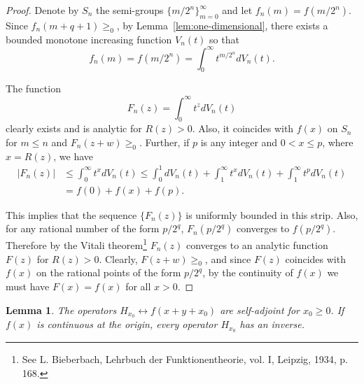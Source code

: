 \documentclass{article}
\newtheorem{lemma}{Lemma}
\begin{document}
\begin{proof}
Denote by $S_n$ the semi-groups $\{m/2^n\}_{m=0}^{\infty}$ and let $f_n(m) = f(m/2^n)$. Since $f_n(m+q+1) \geq_0$, by Lemma~\ref{lem:one-dimensional}, there exists a bounded monotone increasing function $V_n(t)$ so that
\begin{equation}
f_n(m) = f(m/2^n) = \int_0^{\infty} t^{m/2^n} dV_n(t).
\label{eq:discrete-representation}
\end{equation}

The function
\begin{equation}
F_n(z) = \int_0^{\infty} t^z dV_n(t)
\label{eq:analytic-function}
\end{equation}
clearly exists and is analytic for $R(z) > 0$. Also, it coincides with $f(x)$ on $S_n$ for $m \leq n$ and $F_n(z+w) \geq_0$. Further, if $p$ is any integer and $0 < x \leq p$, where $x = R(z)$, we have
\begin{align}
|F_n(z)| &\leq \int_0^{\infty} t^x dV_n(t) \leq \int_0^1 dV_n(t) + \int_1^{\infty} t^x dV_n(t) + \int_1^{\infty} t^p dV_n(t) \\
&= f(0) + f(x) + f(p).
\label{eq:uniform-bound}
\end{align}

This implies that the sequence $\{F_n(z)\}$ is uniformly bounded in this strip. Also, for any rational number of the form $p/2^q$, $F_n(p/2^q)$ converges to $f(p/2^q)$. Therefore by the Vitali theorem\footnote{See L. Bieberbach, Lehrbuch der Funktionentheorie, vol. I, Leipzig, 1934, p. 168.} $F_n(z)$ converges to an analytic function $F(z)$ for $R(z) > 0$. Clearly, $F(z+w) \geq_0$, and since $F(z)$ coincides with $f(x)$ on the rational points of the form $p/2^q$, by the continuity of $f(x)$ we must have $F(x) = f(x)$ for all $x > 0$.
\end{proof}

\begin{lemma}
\label{lem:self-adjoint-operators}
The operators $H_{x_0} \leftrightarrow f(x+y+x_0)$ are self-adjoint for $x_0 \geq 0$. If $f(x)$ is continuous at the origin, every operator $H_{x_0}$ has an inverse.
\end{lemma}
\end{document}
